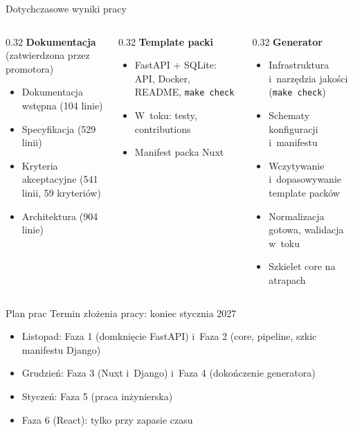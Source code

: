 \documentclass[aspectratio=169, 11pt]{beamer}
\begin{document}
\begin{frame}{Dotychczasowe wyniki pracy}
  \begin{columns}[T]
    \begin{column}{0.32\textwidth}
      \textbf{Dokumentacja}\\
      {\scriptsize (zatwierdzona przez promotora)}
      {\footnotesize
      \begin{itemize}
        \item Dokumentacja wstępna (104 linie)
        \item Specyfikacja (529 linii)
        \item Kryteria akceptacyjne (541 linii, 59 kryteriów)
        \item Architektura (904 linie)
      \end{itemize}
      }
    \end{column}
    \begin{column}{0.32\textwidth}
      \textbf{Template packi}
      {\footnotesize
      \begin{itemize}
        \item FastAPI + SQLite: API, Docker, README, \texttt{make check}
        \item W~toku: testy, contributions
        \item Manifest packa Nuxt
      \end{itemize}
      }
    \end{column}
    \begin{column}{0.32\textwidth}
      \textbf{Generator}
      {\footnotesize
      \begin{itemize}
        \item Infrastruktura i~narzędzia jakości (\texttt{make check})
        \item Schematy konfiguracji i~manifestu
        \item Wczytywanie i~dopasowywanie template packów
        \item Normalizacja gotowa, walidacja w~toku
        \item Szkielet core na atrapach
      \end{itemize}
      }
    \end{column}
  \end{columns}
\end{frame}

\begin{frame}{Plan prac}
  Termin złożenia pracy: koniec stycznia 2027

  \begin{itemize}
    \item Listopad: Faza 1 (domknięcie FastAPI) i~Faza 2 (core, pipeline, szkic manifestu Django)
    \item Grudzień: Faza 3 (Nuxt i~Django) i~Faza 4 (dokończenie generatora)
    \item Styczeń: Faza 5 (praca inżynierska)
    \item Faza 6 (React): tylko przy zapasie czasu
  \end{itemize}
\end{frame}
\end{document}
